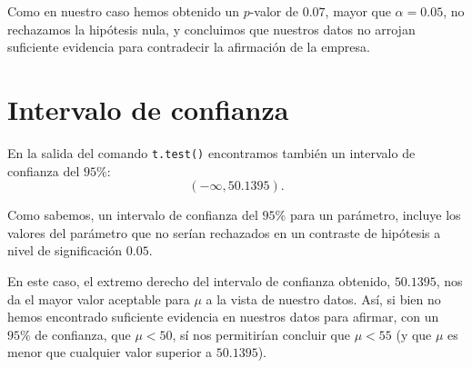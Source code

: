 \documentclass[
  degree=mecinf,
  title=normal,
  toc=normal,
  bib=normal]{mnye}
\begin{document}
Como en nuestro caso hemos obtenido un \(p\)-valor de \(0.07\), mayor que \(\alpha = 0.05\), no rechazamos la hipótesis nula, y concluimos que nuestros datos no arrojan suficiente evidencia para contradecir la afirmación de la empresa.

\hypertarget{conf_int}{%
\section{Intervalo de confianza}\label{conf_int}}

En la salida del comando \texttt{t.test()} encontramos también un intervalo de confianza del \(95\%\):
\[(-\infty, 50.1395).\]

Como sabemos, un intervalo de confianza del \(95\%\) para un parámetro, incluye los valores del parámetro que no serían rechazados en un contraste de hipótesis a nivel de significación \(0.05\).

En este caso, el extremo derecho del intervalo de confianza obtenido, \(50.1395\), nos da el mayor valor aceptable para \(\mu\) a la vista de nuestro datos. Así, si bien no hemos encontrado suficiente evidencia en nuestros datos para afirmar, con un \(95\%\) de confianza, que \(\mu<50\), sí nos permitirían concluir que \(\mu<55\) (y que \(\mu\) es menor que cualquier valor superior a \(50.1395\)).

\end{document}
